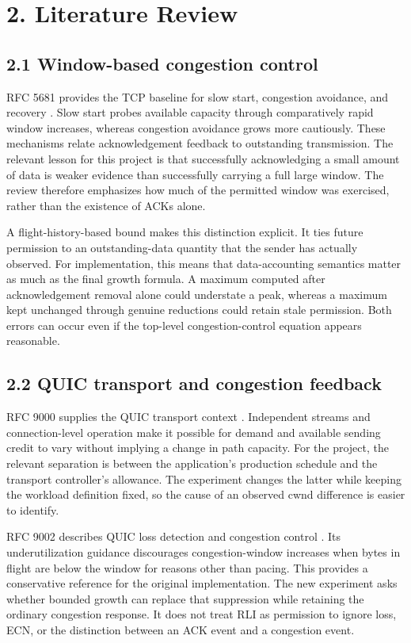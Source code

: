 \clearpage
\section*{2. Literature Review}
\label{sec:literature}
\subsection*{2.1 Window-based congestion control}

RFC 5681 provides the TCP baseline for slow start, congestion avoidance, and recovery \cite{ref5}. Slow start probes available capacity through comparatively rapid window increases, whereas congestion avoidance grows more cautiously. These mechanisms relate acknowledgement feedback to outstanding transmission. The relevant lesson for this project is that successfully acknowledging a small amount of data is weaker evidence than successfully carrying a full large window. The review therefore emphasizes how much of the permitted window was exercised, rather than the existence of ACKs alone.


A flight-history-based bound makes this distinction explicit. It ties future permission to an outstanding-data quantity that the sender has actually observed. For implementation, this means that data-accounting semantics matter as much as the final growth formula. A maximum computed after acknowledgement removal alone could understate a peak, whereas a maximum kept unchanged through genuine reductions could retain stale permission. Both errors can occur even if the top-level congestion-control equation appears reasonable.


\subsection*{2.2 QUIC transport and congestion feedback}

RFC 9000 supplies the QUIC transport context \cite{ref4}. Independent streams and connection-level operation make it possible for demand and available sending credit to vary without implying a change in path capacity. For the project, the relevant separation is between the application's production schedule and the transport controller's allowance. The experiment changes the latter while keeping the workload definition fixed, so the cause of an observed cwnd difference is easier to identify.


RFC 9002 describes QUIC loss detection and congestion control \cite{ref3}. Its underutilization guidance discourages congestion-window increases when bytes in flight are below the window for reasons other than pacing. This provides a conservative reference for the original implementation. The new experiment asks whether bounded growth can replace that suppression while retaining the ordinary congestion response. It does not treat RLI as permission to ignore loss, ECN, or the distinction between an ACK event and a congestion event.





